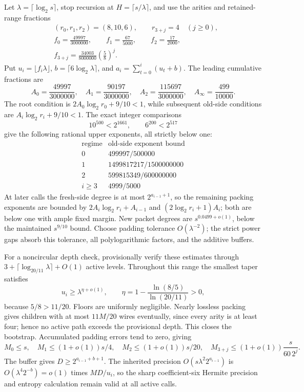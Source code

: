 Let $\lambda=\lceil\log_2s\rceil$, stop recursion at
$H=\lceil s/\lambda\rceil$, and use the arities and retained-range fractions
\begin{align*}
 &(r_0,r_1,r_2)=(8,10,6),\qquad r_{3+j}=4\quad(j\ge0),\\
 &f_0=\frac{49997}{3000000},\qquad
 f_1=\frac{67}{5000},\qquad f_2=\frac{17}{2000},\\
 &f_{3+j}=\frac{34003}{8000000}\left(\frac58\right)^j.
\end{align*}
Put $u_i=\lfloor f_i\lambda\rfloor$, $b=\lceil6\log_2\lambda\rceil$, and
$a_i=\sum_{t=0}^i(u_t+b)$. The leading cumulative fractions are
\[
 A_0=\frac{49997}{3000000},\quad
 A_1=\frac{90197}{3000000},\quad
 A_2=\frac{115697}{3000000},\quad
 A_\infty=\frac{499}{10000}.
\]
The root condition is $2A_0\log_2r_0+9/10<1$, while subsequent old-side
conditions are $A_i\log_2r_i+9/10<1$. The exact integer comparisons
\[
 10^{500}<2^{1661},\qquad 6^{200}<2^{517}
\]
give the following rational upper exponents, all strictly below one:
\[
\begin{array}{c|c}
\text{regime}&\text{old-side exponent bound}\\\hline
0&499997/500000\\
1&1499817217/1500000000\\
2&599815349/600000000\\
 i\ge3&4999/5000
\end{array}
\]
At later calls the fresh-side degree is at most $2^{a_{i-1}+1}$, so the
remaining packing exponents are bounded by
$2A_i\log_2r_i+A_{i-1}$ and $(2\log_2r_i+1)A_i$; both are below one
with ample fixed margin. New packet degrees are $s^{0.0499+o(1)}$, below
the maintained $s^{9/10}$ bound. Choose padding tolerance $O(\lambda^{-2})$;
the strict power gaps absorb this tolerance, all polylogarithmic factors,
and the additive buffers.

For a noncircular depth check, provisionally verify these estimates through
$3+\lceil\log_{20/11}\lambda\rceil+O(1)$ active levels. Throughout this
range the smallest taper satisfies
\[
 u_i\ge\lambda^{\eta+o(1)},\qquad
 \eta=1-\frac{\ln(8/5)}{\ln(20/11)}>0,
\]
because $5/8>11/20$. Floors are uniformly negligible. Nearly lossless
packing gives children with at most $11M/20$ wires eventually, since every
arity is at least four; hence no active path exceeds the provisional depth.
This closes the bootstrap. Accumulated padding errors tend to zero, giving
\[
 M_0\le s,\quad M_1\le(1+o(1))s/4,\quad
 M_2\le(1+o(1))s/20,\quad
 M_{3+j}\le(1+o(1))\frac{s}{60\,2^j}.
\]
The buffer gives $D\ge2^{a_{i-1}+b+1}$. The inherited precision
$O(s\lambda^2 2^{a_{i-1}})$ is $O(\lambda^4 2^{-b})=o(1)$ times $MD/u_i$,
so the sharp coefficient-six Hermite precision and entropy calculation
remain valid at all active calls.

